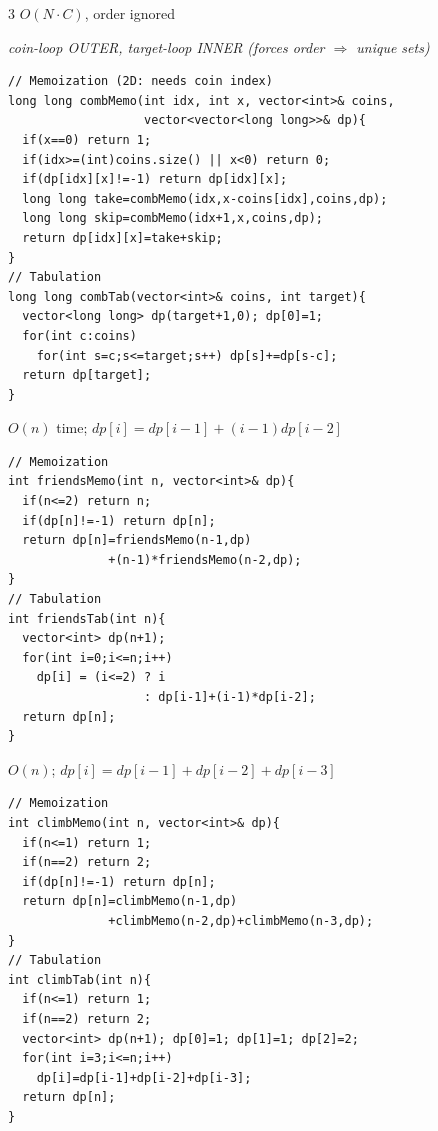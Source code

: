 \documentclass[8pt,landscape,a4paper]{extarticle}
\newcommand{\algo}[2]{\vspace{1pt}{\bfseries #1}\hfill{\footnotesize\color{cx}#2}\par\vspace{-1pt}}
\newcommand{\note}[1]{{\footnotesize\itshape #1}\par}
\begin{document}
\begin{multicols}{3}
\algo{Coin Change 3 --- Ways (Combinations)}{$O(N\cdot C)$, order ignored}
\note{coin-loop OUTER, target-loop INNER (forces order $\Rightarrow$ unique sets)}
\begin{lstlisting}
// Memoization (2D: needs coin index)
long long combMemo(int idx, int x, vector<int>& coins,
                   vector<vector<long long>>& dp){
  if(x==0) return 1;
  if(idx>=(int)coins.size() || x<0) return 0;
  if(dp[idx][x]!=-1) return dp[idx][x];
  long long take=combMemo(idx,x-coins[idx],coins,dp);
  long long skip=combMemo(idx+1,x,coins,dp);
  return dp[idx][x]=take+skip;
}
// Tabulation
long long combTab(vector<int>& coins, int target){
  vector<long long> dp(target+1,0); dp[0]=1;
  for(int c:coins)
    for(int s=c;s<=target;s++) dp[s]+=dp[s-c];
  return dp[target];
}
\end{lstlisting}

\algo{Friends Pairing}{$O(n)$ time; $dp[i]=dp[i{-}1]+(i{-}1)dp[i{-}2]$}
\begin{lstlisting}
// Memoization
int friendsMemo(int n, vector<int>& dp){
  if(n<=2) return n;
  if(dp[n]!=-1) return dp[n];
  return dp[n]=friendsMemo(n-1,dp)
              +(n-1)*friendsMemo(n-2,dp);
}
// Tabulation
int friendsTab(int n){
  vector<int> dp(n+1);
  for(int i=0;i<=n;i++)
    dp[i] = (i<=2) ? i
                   : dp[i-1]+(i-1)*dp[i-2];
  return dp[n];
}
\end{lstlisting}

\algo{Climbing Stairs (1/2/3 steps)}{$O(n)$; $dp[i]=dp[i{-}1]{+}dp[i{-}2]{+}dp[i{-}3]$}
\begin{lstlisting}
// Memoization
int climbMemo(int n, vector<int>& dp){
  if(n<=1) return 1;
  if(n==2) return 2;
  if(dp[n]!=-1) return dp[n];
  return dp[n]=climbMemo(n-1,dp)
              +climbMemo(n-2,dp)+climbMemo(n-3,dp);
}
// Tabulation
int climbTab(int n){
  if(n<=1) return 1;
  if(n==2) return 2;
  vector<int> dp(n+1); dp[0]=1; dp[1]=1; dp[2]=2;
  for(int i=3;i<=n;i++)
    dp[i]=dp[i-1]+dp[i-2]+dp[i-3];
  return dp[n];
}
\end{lstlisting}

\end{multicols}
\end{document}
